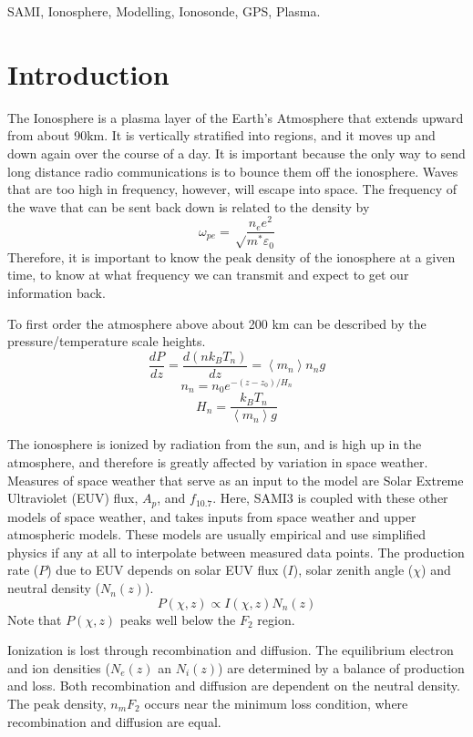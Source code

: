 \documentclass[journal,twoside]{IEEEtran}
\begin{document}
\begin{keywords}
  SAMI, Ionosphere, Modelling, Ionosonde, GPS, Plasma.
\end{keywords}

\section{Introduction}
\PARstart T{he Ionosphere} is a plasma layer of the Earth's Atmosphere that extends upward from about 90km. It is vertically stratified into regions, and it moves up and down again over the course of a day. It is important because the only way to send long distance radio communications is to bounce them off the ionosphere. Waves that are too high in frequency, however, will escape into space. The frequency of the wave that can be sent back down is related to the density by
$$\omega_{pe} = \sqrt\frac{n_e e^2}{m^*\varepsilon_0}$$
Therefore, it is important to know the peak density of the ionosphere at a given time, to know at what frequency we can transmit and expect to get our information back. 

To first order the atmosphere above about 200 km can be
described by the pressure/temperature scale heights.
$$\frac{dP}{dz}=\frac{d \left( nk_BT_n \right)}{dz} = \left< m_n \right> n_ng$$
$$n_n=n_0 e^{-\left( z-z_0 \right)/H_n}$$
$$H_n = \frac{k_BT_n}{\left< m_n \right>g}$$

The ionosphere is ionized by radiation from the sun, and is high up in the atmosphere, and therefore is greatly affected by variation in space weather. Measures of space weather that serve as an input to the model are Solar Extreme Ultraviolet (EUV) flux, $A_p$, and $f_{10.7}$. Here, SAMI3 is coupled with these other models of space weather, and takes inputs from space weather and upper atmospheric models. These models are usually empirical and use simplified physics if any at all to interpolate between measured data points.
The production rate ($P$) due to EUV depends on solar EUV flux ($I$), solar zenith angle ($\chi$) and neutral density ($N_n(z)$).
$$P(\chi,z)\propto I(\chi,z) N_n(z)$$
Note that $P(\chi,z)$ peaks well below the $F_2$ region.

Ionization is lost through recombination and diffusion. 
    The equilibrium electron and ion densities ($N_e(z)$ an $N_i(z)$) are determined by a balance of production and loss.
    Both recombination and diffusion are dependent on the neutral density. The peak density, $n_mF_2$ occurs near the minimum loss condition, where recombination and diffusion are equal.
\end{document}
